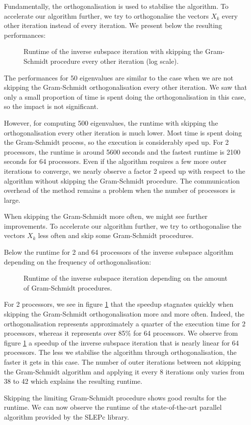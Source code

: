 Fundamentally, the orthogonalisation is used to stabilise the algorithm.
\ifthesis
 To accelerate our algorithm further, we try to orthogonalise the vectors \(X_k\) every other iteration instead of every iteration.
 We present below the resulting performances:

 \begin{figure}[H]
  \centering
  
  \caption{Runtime of the inverse subspace iteration with skipping the Gram-Schmidt procedure every other iteration (log scale).}
 \end{figure}

 The performances for 50 eigenvalues are similar to the case when we are not skipping the Gram-Schmidt orthogonalisation every other iteration.
 We saw that only a small proportion of time is spent doing the orthogonalisation in this case, so the impact is not significant.

 However, for computing 500 eigenvalues, the runtime with skipping the orthogonalisation every other iteration is much lower.
 Most time is spent doing the Gram-Schmidt process, so the execution is considerably sped up.
 For 2 processors, the runtime is around 5600 seconds and the fastest runtime is 2100 seconds for 64 processors.
 Even if the algorithm requires a few more outer iterations to converge, we nearly observe a factor 2 speed up with respect to the algorithm without skipping the Gram-Schmidt procedure.
 The communication overhead of the method remains a problem when the number of processors is large.

 When skipping the Gram-Schmidt more often, we might see further improvements.
\else
 To accelerate our algorithm further, we try to orthogonalise the vectors \(X_k\) less often and skip some Gram-Schmidt procedures.
\fi

Below the runtime for 2 and 64 processors of the inverse subspace algorithm depending on the frequency of orthogonalisation:

\begin{figure}[H]
 \centering
 
 \caption{Runtime of the inverse subspace iteration depending on the amount of Gram-Schmidt procedures.}
 \label{fig:skip_gs}
\end{figure}

For 2 processors, we see in figure \ref{fig:skip_gs} that the speedup stagnates quickly when skipping the Gram-Schmidt orthogonalisation more and more often.
Indeed, the orthogonalisation represents approximately a quarter of the execution time for 2 processors, whereas it represents over 85\% for 64 processors.
We observe from figure \ref{fig:skip_gs} a speedup of the inverse subspace iteration that is nearly linear for 64 processors.
The less we stabilise the algorithm through orthogonalisation, the faster it gets in this case. 
The number of outer iterations between not skipping the Gram-Schmidt algorithm and applying it every 8 iterations only varies from 38 to 42 which explains the resulting runtime.

\ifthesis
 Skipping the limiting Gram-Schmidt procedure shows good results for the runtime.
 We can now observe the runtime of the state-of-the-art parallel algorithm provided by the SLEPc library.
\fi
